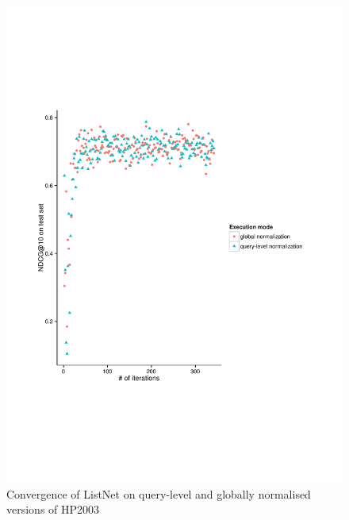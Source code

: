 \begin{figure}
\centering
\includegraphics[trim=5cm 5cm 5cm 5cm, scale=0.85]{gfx/convergence_hp2003.pdf}
\caption{Convergence of ListNet on query-level and globally normalised versions of HP2003}
\label{fig:convergence_hp2003}
\end{figure}

